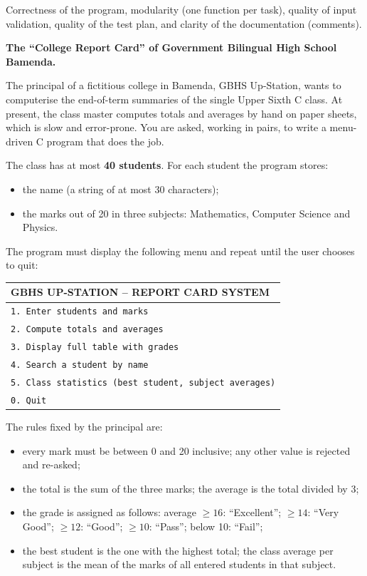 \documentclass[11pt]{article}
\newcounter{popsec}
\newcounter{popsub}
\newcommand{\courssub}[1]{%
  \stepcounter{popsub}%
  \par\vspace{9pt}\noindent{\popxbold\fontsize{11.5}{13}\selectfont\color{popink}{\color{poporange}\thepopsec.\thepopsub}\hspace{6pt}#1}\par\nopagebreak\vspace{4pt}
}
\begin{document}
\begin{aretenir}
Correctness of the program, modularity (one function per task), quality of input validation, quality of the test plan, and clarity of the documentation (comments).
\end{aretenir}

\courssub{Situation}

\textbf{The ``College Report Card'' of Government Bilingual High School Bamenda.}\par
The principal of a fictitious college in Bamenda, GBHS Up-Station, wants to computerise the end-of-term summaries of the single Upper Sixth C class. At present, the class master computes totals and averages by hand on paper sheets, which is slow and error-prone. You are asked, working in pairs, to write a menu-driven C program that does the job.

The class has at most \textbf{40 students}. For each student the program stores:

\begin{itemize}
\item the name (a string of at most 30 characters);
\item the marks out of 20 in three subjects: Mathematics, Computer Science and Physics.
\end{itemize}

The program must display the following menu and repeat until the user chooses to quit:

\begin{center}
\begin{tabular}{|l|}
\hline
\rowcolor{popblueL} \textbf{GBHS UP-STATION -- REPORT CARD SYSTEM} \\
\hline
\texttt{1. Enter students and marks} \\
\texttt{2. Compute totals and averages} \\
\texttt{3. Display full table with grades} \\
\texttt{4. Search a student by name} \\
\texttt{5. Class statistics (best student, subject averages)} \\
\texttt{0. Quit} \\
\hline
\end{tabular}
\end{center}

The rules fixed by the principal are:

\begin{itemize}
\item every mark must be between 0 and 20 inclusive; any other value is rejected and re-asked;
\item the total is the sum of the three marks; the average is the total divided by 3;
\item the grade is assigned as follows: average $\geq 16$: ``Excellent''; $\geq 14$: ``Very Good''; $\geq 12$: ``Good''; $\geq 10$: ``Pass''; below 10: ``Fail'';
\item the best student is the one with the highest total; the class average per subject is the mean of the marks of all entered students in that subject.
\end{itemize}
\end{document}
